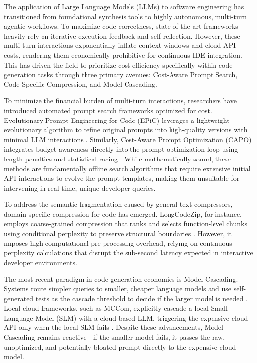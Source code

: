 \documentclass[11pt,a4paper,twocolumn]{article}
\begin{document}
The application of Large Language Models (LLMs) to software engineering has transitioned from foundational synthesis tools to highly autonomous, multi-turn agentic workflows. To maximize code correctness, state-of-the-art frameworks heavily rely on iterative execution feedback and self-reflection. However, these multi-turn interactions exponentially inflate context windows and cloud API costs, rendering them economically prohibitive for continuous IDE integration. This has driven the field to prioritize cost-efficiency specifically within code generation tasks through three primary avenues: Cost-Aware Prompt Search, Code-Specific Compression, and Model Cascading.

To minimize the financial burden of multi-turn interactions, researchers have introduced automated prompt search frameworks optimized for cost. Evolutionary Prompt Engineering for Code (EPiC) leverages a lightweight evolutionary algorithm to refine original prompts into high-quality versions with minimal LLM interactions \cite{taherkhani2025epic}. Similarly, Cost-Aware Prompt Optimization (CAPO) integrates budget-awareness directly into the prompt optimization loop using length penalties and statistical racing \cite{zehle2025capo}. While mathematically sound, these methods are fundamentally offline search algorithms that require extensive initial API interactions to evolve the prompt templates, making them unsuitable for intervening in real-time, unique developer queries.

To address the semantic fragmentation caused by general text compressors, domain-specific compression for code has emerged. LongCodeZip, for instance, employs coarse-grained compression that ranks and selects function-level chunks using conditional perplexity to preserve structural boundaries \cite{shi2025longcodezip}. However, it imposes high computational pre-processing overhead, relying on continuous perplexity calculations that disrupt the sub-second latency expected in interactive developer environments. 

The most recent paradigm in code generation economics is Model Cascading. Systems route simpler queries to smaller, cheaper language models and use self-generated tests as the cascade threshold to decide if the larger model is needed \cite{chen2024modelcascading}. Local-cloud frameworks, such as MCCom, explicitly cascade a local Small Language Model (SLM) with a cloud-based LLM, triggering the expensive cloud API only when the local SLM fails \cite{lu2026mccom}. Despite these advancements, Model Cascading remains reactive—if the smaller model fails, it passes the raw, unoptimized, and potentially bloated prompt directly to the expensive cloud model.
\end{document}

